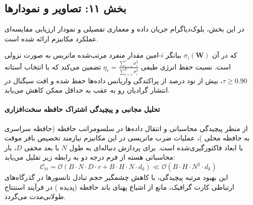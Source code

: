 \begin{center}
\end{center}

\subsection*{بخش ۱۱: تصاویر و نمودارها }
در این بخش، بلوک‌دیاگرام جریان داده و معماری تفصیلی و نمودار ارزیابی مقایسه‌ای عملکرد مکانیزم  ارائه شده است.



که در آن $\sigma_i(\mathbf{W})$ بیانگر $i$-امین مقدار منفرد مرتب‌شده ماتریس به صورت نزولی است. نسبت حفظ انرژی طیفی $\eta_r = \frac{\sum_{i=1}^r \sigma_i^2}{\sum_{i=1}^{d} \sigma_i^2}$ تضمین می‌کند که با انتخاب آستانه $\tau \ge 0.90$، بیش از نود درصد از پراکندگی واریانس داده‌ها حفظ شده و افت سیگنال در انتشار گرادیان رو به عقب به حداقل ممکن کاهش می‌یابد.

\paragraph{تحلیل مجانبی و پیچیدگی اشتراک حافظه سخت‌افزاری}
از منظر پیچیدگی محاسباتی و انتقال داده‌ها در سلسومراتب حافظه (حافظه سراسری  به حافظه محلی )، عملیات ضرب ماتریسی در این مکانیزم نیازمند تخصیص بافر موقت با ابعاد فاکتورگیری‌شده است. برای پردازش دنباله‌ای به طول $N$ با بعد مخفی $D$، بار محاسباتی هسته از فرم درجه دو به رابطه زیر تقلیل می‌یابد:
\begin{equation}
\label{eq:complexity_tt}
\mathcal{C}_{\text{tt}} = \mathcal{O}\left( B \cdot N \cdot D \cdot r + B \cdot H \cdot N \cdot d_k \right) \ll \mathcal{O}\left( B \cdot H \cdot N^2 \cdot d_k \right)
\end{equation}
این بهبود مرتبه پیچیدگی، با کاهش چشمگیر حجم تبادل تانسورها در گذرگاه‌های ارتباطی کارت گرافیک، مانع از اشباع پهنای باند حافظه (پدیده ) در فرآیند استنتاج طولانی‌مدت می‌گردد.